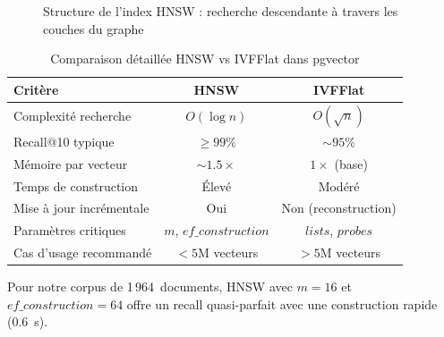 \documentclass[12pt,a4paper]{article}
\begin{document}
\begin{figure}[H]
\caption{Structure de l'index HNSW : recherche descendante \`{a} travers les couches du graphe}
\label{fig:hnsw}
\end{figure}

\begin{table}[H]
\centering
\caption{Comparaison d\'{e}taill\'{e}e HNSW vs IVFFlat dans pgvector}
\label{tab:index}
\begin{tabular}{@{}lcc@{}}
\toprule
\textbf{Crit\`{e}re} & \textbf{HNSW} & \textbf{IVFFlat} \\
\midrule
Complexit\'{e} recherche  & $O(\log n)$     & $O(\sqrt{n})$ \\
Recall@10 typique       & $\geq 99\%$     & $\sim 95\%$ \\
M\'{e}moire par vecteur     & $\sim 1.5\times$ & $1\times$ (base) \\
Temps de construction    & \'{E}lev\'{e}         & Mod\'{e}r\'{e} \\
Mise \`{a} jour incr\'{e}mentale & Oui           & Non (reconstruction) \\
Param\`{e}tres critiques    & $m$, $ef\_construction$ & $lists$, $probes$ \\
Cas d'usage recommand\'{e} & $< 5$M vecteurs & $> 5$M vecteurs \\
\bottomrule
\end{tabular}
\end{table}

Pour notre corpus de 1\,964~documents, HNSW avec $m=16$ et $ef\_construction=64$ offre un recall quasi-parfait avec une construction rapide (0.6~s).
\end{document}
